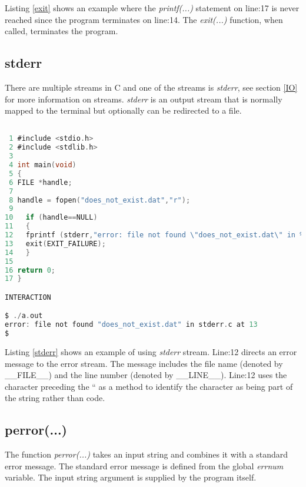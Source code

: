 Listing \ref{exit} shows an example where the \textit{printf(...)} statement on line:17 is never reached since the program terminates on line:14. The \textit{exit(...)} function, when called, terminates the program.

\subsection{stderr}


There are multiple streams in C and one of the streams is \textit{stderr}, see section \ref{IO} for more information on streams. \textit{stderr} is an output stream that is normally mapped to the terminal but optionally can be redirected to a file.

\begin{lstlisting}[language=C,showstringspaces=false,caption={File stderr.c, using stderr stream},captionpos=b,label=stderr]

 1 #include <stdio.h>
 2 #include <stdlib.h>
 3
 4 int main(void)
 5 {
 6 FILE *handle;
 7  
 8 handle = fopen("does_not_exist.dat","r");
 9
10   if (handle==NULL)
11   {
12   fprintf (stderr,"error: file not found \"does_not_exist.dat\" in %s at %d\n",__FILE__,__LINE__);
13   exit(EXIT_FAILURE);
14   }
15
16 return 0;
17 }

INTERACTION

$ ./a.out
error: file not found "does_not_exist.dat" in stderr.c at 13
$
\end{lstlisting}

Listing \ref{stderr} shows an example of using \textit{stderr} stream. Line:12 directs an error message to the error stream. The message includes the file name (denoted by \_\_FILE\_\_) and the line number (denoted by \_\_LINE\_\_). Line:12 uses the \escape{} character preceding  the “ as a method to identify the character as being part of the string rather than code.

\subsection{perror(...)}


The function \textit{perror(...)} takes an input string and combines it with a standard error message. The standard error message is defined from the global \textit{errnum} variable. The input string argument is supplied by the program itself.\\

